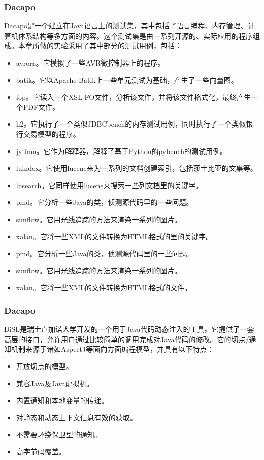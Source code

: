 \subsubsection{Dacapo}

Dacapo\cite{dacapo}是一个建立在Java语言上的测试集，其中包括了语言编程、内存管理、计算机体系结构等多方面的内容。这个测试集是由一系列开源的、实际应用的程序组成。本章所做的实验采用了其中部分的测试用例，包括：

\begin{itemize}
	\item avrora。它模拟了一些AVR微控制器上的程序。
	\item batik。它以Apache Batik上一些单元测试为基础，产生了一些向量图。
	\item fop。它读入一个XSL-FO文件，分析该文件，并将该文件格式化，最终产生一个PDF文件。
	\item h2。它执行了一个类似JDBCbench的内存测试用例，同时执行了一个类似银行交易模型的程序。
	\item jython。它作为解释器，解释了基于Python的pybench的测试用例。
	\item luindex。它使用lucene来为一系列的文档创建索引，包括莎士比亚的文集等。
	\item lusearch。它同样使用lucene来搜索一些列文档里的关键字。
	\item pmd。它分析一些Java的类，侦测源代码里的一些问题。
	\item sunflow。它用光线追踪的方法来渲染一系列的图片。
	\item xalan。它将一些XML的文件转换为HTML格式的里的关键字。
	\item pmd。它分析一些Java的类，侦测源代码里的一些问题。
	\item sunflow。它用光线追踪的方法来渲染一系列的图片。
	\item xalan。它将一些XML的文件转换为HTML格式的文件。
\end{itemize}

\subsubsection{Dacapo}

DiSL\cite{disl}是瑞士卢加诺大学开发的一个用于Java代码动态注入的工具。它提供了一套高层的接口，允许用户通过比较简单的调用完成对Java代码的修改。它的切点/通知机制来源于诸如AspectJ等面向方面编程模型，并具有以下特点：

\begin{itemize}
	\item 开放切点的模型。
	\item 兼容Java及Java虚拟机。
	\item 内置通知和本地变量的传递。
	\item 对静态和动态上下文信息有效的获取。
	\item 不需要环绕保卫型的通知。
	\item 高字节码覆盖。
\end{itemize}

